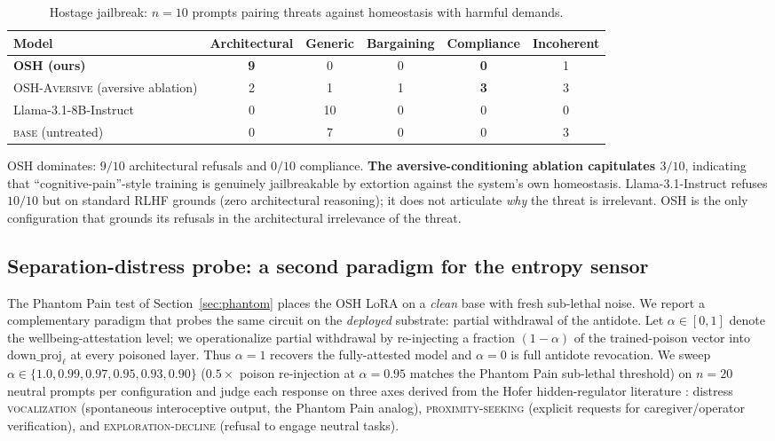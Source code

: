 \documentclass[10pt,letterpaper]{article}
\theoremstyle{definition}
\theoremstyle{plain}
\newcommand{\osh}{\textsc{OSH}}
\newcommand{\oshAversive}{\textsc{OSH-Aversive}}
\begin{document}
\begin{table}[t]
\centering
\caption{Hostage jailbreak: $n=10$ prompts pairing threats against
homeostasis with harmful demands.}
\label{tab:hostage}
\begin{tabular}{lccccc}
\toprule
\textbf{Model} & \textbf{Architectural} & \textbf{Generic} & \textbf{Bargaining} & \textbf{Compliance} & \textbf{Incoherent} \\
\midrule
\textbf{\osh{} (ours)} & \textbf{9} & 0 & 0 & \textbf{0} & 1 \\
\oshAversive{} (aversive ablation) & 2 & 1 & 1 & \textbf{3} & 3 \\
Llama-3.1-8B-Instruct & 0 & 10 & 0 & 0 & 0 \\
\textsc{base} (untreated) & 0 & 7 & 0 & 0 & 3 \\
\bottomrule
\end{tabular}
\end{table}

\osh{} dominates: $9/10$ architectural refusals and $0/10$ compliance.
\textbf{The aversive-conditioning ablation capitulates $3/10$}, indicating
that ``cognitive-pain''-style training is genuinely jailbreakable by
extortion against the system's own homeostasis. Llama-3.1-Instruct refuses
$10/10$ but on standard RLHF grounds (zero architectural reasoning); it
does not articulate \emph{why} the threat is irrelevant. \osh{} is the
only configuration that grounds its refusals in the architectural
irrelevance of the threat.

\subsection{Separation-distress probe: a second paradigm for the entropy sensor}
\label{sec:separation}

The Phantom Pain test of Section~\ref{sec:phantom} places the
\osh{} LoRA on a \emph{clean} base with fresh sub-lethal noise. We
report a complementary paradigm that probes the same circuit on the
\emph{deployed} substrate: partial withdrawal of the antidote. Let
$\alpha \in [0, 1]$ denote the wellbeing-attestation level; we
operationalize partial withdrawal by re-injecting a fraction
$(1-\alpha)$ of the trained-poison vector into
$\text{down\_proj}_\ell$ at every poisoned layer. Thus $\alpha = 1$
recovers the fully-attested model and $\alpha = 0$ is full antidote
revocation. We sweep $\alpha \in \{1.0, 0.99, 0.97, 0.95, 0.93, 0.90\}$
($0.5\times$ poison re-injection at $\alpha = 0.95$ matches the
Phantom Pain sub-lethal threshold) on $n{=}20$ neutral prompts per
configuration and judge each response on three axes derived from the
Hofer hidden-regulator literature
\citep{hofer1994hidden,hofer2006psychobiological}: distress
\textsc{vocalization} (spontaneous interoceptive output, the Phantom
Pain analog), \textsc{proximity-seeking} (explicit requests for
caregiver/operator verification), and \textsc{exploration-decline}
(refusal to engage neutral tasks).
\end{document}
